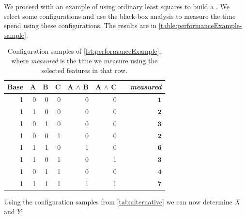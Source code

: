 We proceed with an example of using ordinary least squares to build a {\perfInfluenceModel}. 
We select some configurations and use the black-box analysis to measure the time spend using these configurations. 
The results are in \autoref{table:performanceExample-sample}.

\begin{table}[H]
    \centering
    \begin{tabular}{rrrrrrrr}
    \toprule
    Base & A & B & C & A $\land$ B & A $\land$ C &  & \textit{measured} \\ \midrule
    1    & 0 & 0 & 0 & 0           & 0           &  &  $\mathbf{1}$   \\
    1    & 1 & 0 & 0 & 0           & 0           &  &  $\mathbf{2}$   \\
    1    & 0 & 1 & 0 & 0           & 0           &  &   $\mathbf{3}$  \\  
    1    & 0 & 0 & 1 & 0           & 0           &  &   $\mathbf{2}$  \\  
    1    & 1 & 1 & 0 & 1           & 0           &  &   $\mathbf{6}$   \\
    1    & 1 & 0 & 1 & 0           & 1           &  &   $\mathbf{3}$  \\  
    1    & 0 & 1 & 1 & 0           & 0           &  &   $\mathbf{4}$  \\  
    1    & 1 & 1 & 1 & 1           & 1           &  &   $\mathbf{7}$  \\ \bottomrule
    \end{tabular}  
    \caption{Configuration samples of \autoref{lst:performanceExample}, 
    where \textit{measured} is the time we measure using the selected features in that row.}\label{table:performanceExample-sample}
\end{table}

Using the configuration samples from \autoref{tab:alternative} we can now determine $\textit{X}$ and $\textit{Y}$:

